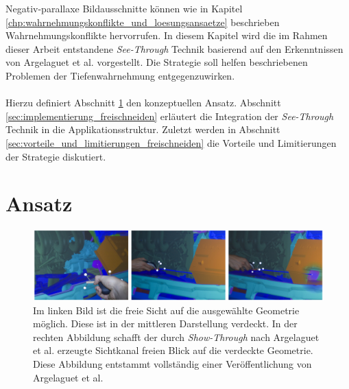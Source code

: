 Negativ-parallaxe Bildausschnitte können wie in Kapitel \ref{chp:wahrnehmungskonflikte_und_loesungsansaetze} beschrieben Wahrnehmungskonflikte hervorrufen. In diesem  Kapitel wird die im Rahmen dieser Arbeit entstandene \emph{See-Through} Technik basierend auf den Erkenntnissen von Argelaguet et al. \cite{argelaguet:2010} vorgestellt. Die Strategie soll helfen beschriebenen Problemen der Tiefenwahrnehmung entgegenzuwirken.
\\\\
Hierzu definiert Abschnitt \ref{sec:ansatz} den konzeptuellen Ansatz. Abschnitt \ref{sec:implementierung_freischneiden} erläutert die Integration der \emph{See-Through} Technik in die Applikationsstruktur. Zuletzt werden in Abschnitt \ref{sec:vorteile_und_limitierungen_freischneiden} die Vorteile und Limitierungen der Strategie diskutiert.


\section{Ansatz}
\label{sec:ansatz}

\begin{figure}
	\begin{center}
		\includegraphics[width=12cm]{img/show_through_related.pdf}
	\end{center}
	\caption{Im linken Bild ist die freie Sicht auf die ausgewählte Geometrie möglich. Diese ist in der mittleren Darstellung verdeckt. In der rechten Abbildung schafft der durch \emph{Show-Through} nach Argelaguet et al. erzeugte Sichtkanal freien Blick auf die verdeckte Geometrie. Diese Abbildung entstammt vollständig einer Veröffentlichung von Argelaguet et al. \cite{argelaguet:2010}} 
	\label{fig:show_through_related}
\end{figure}

